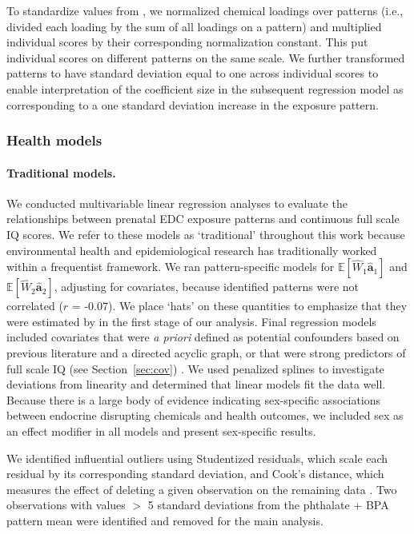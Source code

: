 To standardize values from \bnmfc, we normalized chemical loadings over patterns (i.e., divided each loading by the sum of all loadings on a pattern) and multiplied individual scores by their corresponding normalization constant. This put individual scores on different patterns on the same scale. We further transformed patterns to have standard deviation equal to one across individual scores to enable interpretation of the coefficient size in the subsequent regression model as corresponding to a one standard deviation increase in the exposure pattern.

\subsubsection{Health models}
\label{sec.health}
\paragraph{Traditional models.} We conducted multivariable linear regression analyses to evaluate the relationships between prenatal EDC exposure patterns and continuous full scale IQ scores. We refer to these models as `traditional' throughout this work because environmental health and epidemiological research has traditionally worked within a frequentist framework. We ran pattern-specific models for $\mathbb{E}[\widehat{W}_1\widehat{\mathbf{a}}_1]$ and $\mathbb{E}[\widehat{W}_2\widehat{\mathbf{a}}_2]$, adjusting for covariates, because identified patterns were not correlated ($r$ = -0.07). We place `hats' on these quantities to emphasize that they were estimated by \bnmf in the first stage of our analysis. Final regression models included covariates that were \textit{a priori} defined as potential confounders based on previous literature and a directed acyclic graph, or that were strong predictors of full scale IQ (see Section~\ref{sec:cov}) \citep{pearl2009causality, hernan2010causal}. We used penalized splines to investigate deviations from linearity and determined that linear models fit the data well. Because there is a large body of evidence indicating sex-specific associations between endocrine disrupting chemicals and health outcomes, we included sex as an effect modifier in all models and present sex-specific results.

We identified influential outliers using Studentized residuals, which scale each residual by its corresponding standard deviation, and Cook's distance, which measures the effect of deleting a given observation on the remaining data \citep{kleinbaum2013applied}. Two observations with values $>$ 5 standard deviations from  the phthalate + BPA pattern mean were identified and removed for the main analysis.

